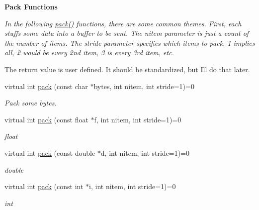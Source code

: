 \begin{Indent}\textbf{ Pack Functions}\par
{\em In the following \hyperlink{classMWRMComm_a611ac04479ee1c3731cf459427d18fb4}{pack()} functions, there are some common themes. First, each stuffs some data into a buffer to be sent. The nitem parameter is just a count of the number of items. The stride parameter specifies {\itshape which} items to pack. 1 implies all, 2 would be every 2nd item, 3 is every 3rd item, etc.

The return value is user defined. It should be standardized, but I\textquotesingle{}ll do that later. }\begin{DoxyCompactItemize}
\item 
\mbox{\label{classMWRMComm_a611ac04479ee1c3731cf459427d18fb4}} 
virtual int \hyperlink{classMWRMComm_a611ac04479ee1c3731cf459427d18fb4}{pack} (const char $\ast$bytes, int nitem, int stride=1)=0
\begin{DoxyCompactList}\small\item\em Pack some bytes. \end{DoxyCompactList}\item 
\mbox{\label{classMWRMComm_a247f848fbef158e09d9fa01020c2e7ae}} 
virtual int \hyperlink{classMWRMComm_a247f848fbef158e09d9fa01020c2e7ae}{pack} (const float $\ast$f, int nitem, int stride=1)=0
\begin{DoxyCompactList}\small\item\em float \end{DoxyCompactList}\item 
\mbox{\label{classMWRMComm_a00262ce5d015b7ede73b7b68b9d9306e}} 
virtual int \hyperlink{classMWRMComm_a00262ce5d015b7ede73b7b68b9d9306e}{pack} (const double $\ast$d, int nitem, int stride=1)=0
\begin{DoxyCompactList}\small\item\em double \end{DoxyCompactList}\item 
\mbox{\label{classMWRMComm_ae0da5373d13493779930df6121e78558}} 
virtual int \hyperlink{classMWRMComm_ae0da5373d13493779930df6121e78558}{pack} (const int $\ast$i, int nitem, int stride=1)=0
\begin{DoxyCompactList}\small\item\em int \end{DoxyCompactList}\item 

\end{DoxyCompactItemize}
\end{Indent}
